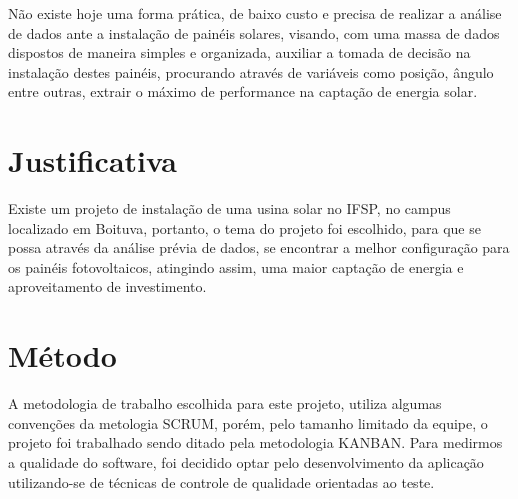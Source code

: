 Não existe hoje uma forma prática, de baixo custo e precisa de realizar a análise de dados ante a instalação de painéis solares, visando, com uma massa de dados dispostos de maneira simples e organizada, auxiliar a tomada de decisão na instalação destes painéis, procurando através de variáveis como posição, ângulo entre outras, extrair o máximo de performance na captação de energia solar.

\section{Justificativa}

Existe um projeto de instalação de uma usina solar no IFSP, no campus localizado em Boituva, portanto, o tema do projeto foi escolhido, para que se possa através da análise prévia de dados, se encontrar a melhor configuração para os painéis fotovoltaicos, atingindo assim, uma maior captação de energia e aproveitamento de investimento.

\section{Método}

A metodologia de trabalho escolhida para este projeto, utiliza algumas convenções da metologia SCRUM, porém, pelo tamanho limitado da equipe, o projeto foi trabalhado sendo ditado pela metodologia KANBAN.
Para medirmos a qualidade do software, foi decidido optar pelo desenvolvimento da aplicação utilizando-se de técnicas de controle de qualidade orientadas ao teste.
